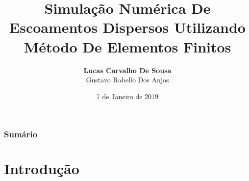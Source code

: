 \documentclass{beamer}
\title[Métodos Numéricos]{Simulação Numérica De Escoamentos Dispersos Utilizando Método De Elementos Finitos} %
\author{\textbf{Lucas Carvalho De Sousa} \\ Gustavo Rabello Dos Anjos} %
\institute[UERJ] %
{
  Universidade do Estado do Rio de Janeiro \\ %
  \medskip
  \href{mailto:encarvlucas@hotmail.com}{\textit{encarvlucas@hotmail.com}} %
}
\date{7 de Janeiro de 2019} %
\begin{document}
\begin{frame}
  \titlepage %
\end{frame}

\begin{frame}
  \frametitle{Sumário} %
  \tableofcontents %
\end{frame}


\section{Introdução} %
\end{document}
